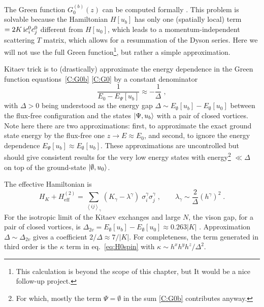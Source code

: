 The Green function $G_0^{(b)}(z)$ can be computed formally \cite{Panigrahi_2023}. This problem is solvable because the Hamiltonian $H[u_b]$ has only one (spatially local) term $=2K \, \mathrm{i} c_i^0c_j^0$ different from $H[u_0]$, which leads to a momentum-independent scattering $T$ matrix, which allows for a resummation of the Dyson series. Here we will not use the full Green function\footnote{This calculation is beyond the scope of this chapter, but It would be a nice follow-up project.}, but rather a simple approximation.

Kitaev trick  \cite{Kitaev2006} is to (drastically) approximate the energy dependence in the Green function equations~\eqref{C:G0b} \eqref{C:G0} by a constant denominator
\begin{equation}
    \frac{1}{E_0-E_\Psi[u_b]} \approx -\frac{1}{\Delta} \; ,
\end{equation}
with $\Delta>0$ being understood as the energy gap $\Delta \sim E_{\emptyset}[u_b]-E_{\emptyset}[u_0]$ between the flux-free configuration and the states $\ket{\Psi,u_b}$ with a pair of closed vortices.
Note here there are two approximations: first, to approximate the exact ground state energy by the flux-free one $z\to E \approx E_0$,  and second, to ignore the energy dependence $E_\Psi[u_b]\approx E_{\emptyset}[u_b] $. These approximations are uncontrolled but should give consistent results for the very low energy states with energy\footnote{For which, mostly the term $\Psi=\emptyset$ in the sum \eqref{C:G0b} contributes anyway. } $\ll \Delta$ on top of the ground-state $\ket{\emptyset,u_0}$.

The effective Hamiltonian is
\begin{equation}
    H_{K} + H_{\text{eff}}^{(2)} =  \sum_{ \left< ij \right>_{\gamma} } ( K_\gamma - \lambda^{\gamma}) \;
     \sigma^{\gamma}_i \sigma^{\gamma}_j \; , \qquad    \lambda_{\gamma} \sim \frac{2}{\Delta} \left( h^{\gamma} \right)^2  \; .
\end{equation}
For the isotropic limit of the Kitaev exchanges and large $N$, the vison gap, for a pair of closed vortices, is $\Delta_{2v}=E_{\emptyset}[u_b]-E_{\emptyset}[u_0] \approx 0.263 |K|$ \cite{Panigrahi_2023}.
Approximation $\Delta\sim\Delta_{2v}$ gives a coefficient $2/\Delta \approx 7/ |K|$.
For completeness, the term generated in third order is the $\kappa$ term in eq.~\eqref{eq:H0spin} with $\kappa\sim h^xh^yh^z/\Delta^2$.



